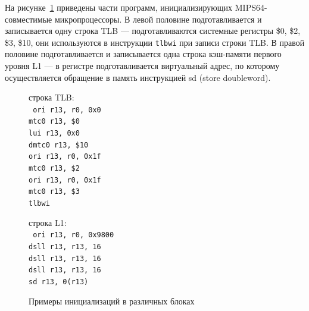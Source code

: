 На рисунке~\ref{fig:blocks_init_examples} приведены части программ, инициализирующих MIPS64-совместимые микропроцессоры. В левой половине подготавливается и записывается одну строка TLB --- подготавливаются системные регистры \$0, \$2, \$3, \$10, они используются в инструкции \texttt{tlbwi} при записи строки TLB. В правой половине подготавливается и записывается одна строка кэш-памяти первого уровня L1 --- в регистре подготавливается виртуальный адрес, по которому осуществляется обращение в память инструкцией sd (store doubleword).

\begin{figure}[h] \centering
\parbox{0.4\textwidth}{
строка TLB:\\
{\small \tt
	ori r13, r0, 0x0\\
	mtc0 r13, \$0\\
	lui r13, 0x0\\
	dmtc0 r13, \$10\\
	ori r13, r0, 0x1f\\
	mtc0 r13, \$2\\
	ori r13, r0, 0x1f\\
	mtc0 r13, \$3\\
	tlbwi\\}
} \qquad
\parbox{0.4\textwidth}{
строка L1:\\
{\small \tt
	ori r13, r0, 0x9800\\
	dsll r13, r13, 16\\
	dsll r13, r13, 16\\
	dsll r13, r13, 16\\
	sd r13, 0(r13)\\}
} \caption{Примеры инициализаций в различных блоках}\label{fig:blocks_init_examples}
\end{figure}


